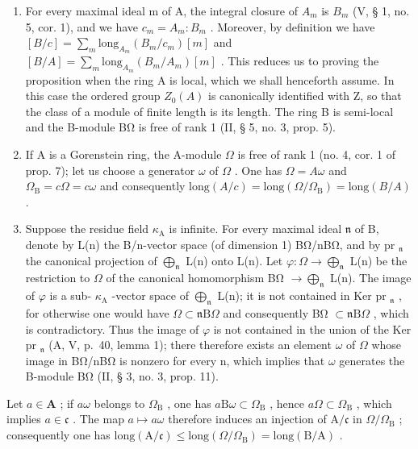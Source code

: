 \begin{enumerate}
\def\labelenumi{\Alph{enumi})}
\item
  For every maximal ideal m of A, the integral closure of \(A_{m}\) is \(B_{m}\) (V, § 1, no. 5, cor. 1), and we have \(c_{m} = A_{m} : B_{m}\) . Moreover, by definition we have \([B/c] = \sum_{m} \text{long}_{A_{m}}(B_{m}/c_{m})[m]\) and \([B/A] = \sum_{m} \text{long}_{A_{m}}(B_{m}/A_{m})[m]\) . This reduces us to proving the proposition when the ring A is local, which we shall henceforth assume. In this case the ordered group \(Z_{0}(A)\) is canonically identified with Z, so that the class of a module of finite length is its length. The ring B is semi-local and the B-module BΩ is free of rank 1 (II, § 5, no. 3, prop. 5).
\item
  If A is a Gorenstein ring, the A-module \(\Omega\) is free of rank 1 (no. 4, cor. 1 of prop. 7); let us choose a generator \(\omega\) of \(\Omega\) . One has \(\Omega = A\omega\) and \(\Omega_{\mathrm{B}} = c\Omega = c\omega\) and consequently \(\text{long}(A/c) = \text{long}(\Omega/\Omega_{\mathrm{B}}) = \text{long}(B/A)\) .
\item
  Suppose the residue field \(\kappa_{\mathrm{A}}\) is infinite. For every maximal ideal \(\mathfrak{n}\) of B, denote by L(n) the B/n-vector space (of dimension 1) BΩ/nBΩ, and by pr \(_{\mathfrak{n}}\) the canonical projection of \(\bigoplus_{\mathfrak{n}}\) L(n) onto L(n). Let \(\varphi : \Omega \longrightarrow \bigoplus_{\mathfrak{n}}\) L(n) be the restriction to \(\Omega\) of the canonical homomorphism BΩ \(\longrightarrow \bigoplus_{\mathfrak{n}}\) L(n). The image of \(\varphi\) is a sub- \(\kappa_{\mathrm{A}}\) -vector space of \(\bigoplus_{\mathfrak{n}}\) L(n); it is not contained in Ker pr \(_{\mathfrak{n}}\) , for otherwise one would have \(\Omega \subset \mathfrak{n}\mathrm{B}\Omega\) and consequently BΩ \(\subset \mathfrak{n}\mathrm{B}\Omega\) , which is contradictory. Thus the image of \(\varphi\) is not contained in the union of the Ker pr \(_{\mathfrak{n}}\) (A, V, p.~40, lemma 1); there therefore exists an element \(\omega\) of \(\Omega\) whose image in BΩ/nBΩ is nonzero for every n, which implies that \(\omega\) generates the B-module BΩ (II, § 3, no. 3, prop. 11).
\end{enumerate}

Let \(a \in \mathbf{A}\) ; if \(a\omega\) belongs to \(\Omega_{\mathrm{B}}\) , one has \(a\mathrm{B}\omega \subset \Omega_{\mathrm{B}}\) , hence \(a\Omega \subset \Omega_{\mathrm{B}}\) , which implies \(a \in \mathfrak{c}\) . The map \(a \mapsto a\omega\) therefore induces an injection of \(\mathrm{A}/\mathfrak{c}\) in \(\Omega/\Omega_{\mathrm{B}}\) ; consequently one has \(\mathrm{long}(\mathrm{A}/\mathfrak{c}) \leqslant \mathrm{long}(\Omega/\Omega_{\mathrm{B}}) = \mathrm{long}(\mathrm{B}/\mathrm{A})\) .

